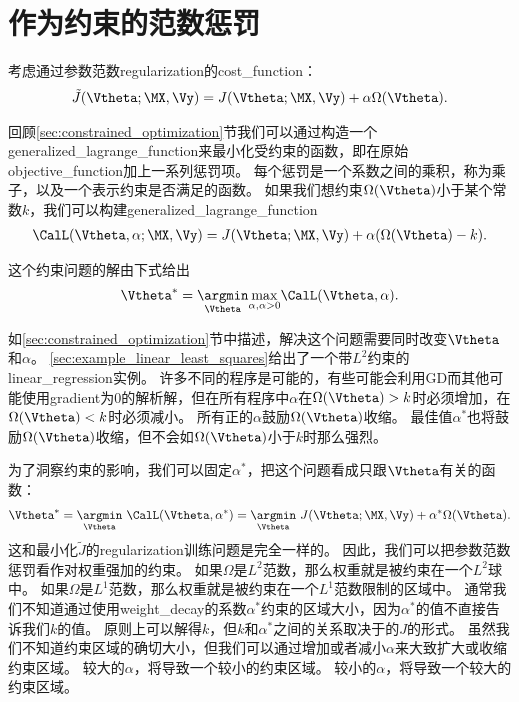  
 \section{作为约束的范数惩罚}
 \label{sec:7.2}
考虑通过参数范数\gls{regularization}的\gls{cost_function}：
\begin{align}
 \tilde{J}(\Vtheta;\MX, \Vy) = J(\Vtheta;\MX, \Vy) + \alpha \Omega(\Vtheta) .
\end{align}

回顾\ref{sec:constrained_optimization}节我们可以通过构造一个\gls{generalized_lagrange_function}来最小化受约束的函数，即在原始\gls{objective_function}加上一系列惩罚项。
每个惩罚是一个系数之间的乘积，称为乘子，以及一个表示约束是否满足的函数。
如果我们想约束$\Omega(\Vtheta)$小于某个常数$k$，我们可以构建\gls{generalized_lagrange_function}
\begin{align}
 \CalL(\Vtheta, \alpha; \MX, \Vy) = J(\Vtheta; \MX, \Vy) + \alpha (\Omega(\Vtheta) - k).
\end{align}

这个约束问题的解由下式给出
\begin{align}
 \Vtheta^* = \underset{\Vtheta}{ \argmin} \underset{\alpha, \alpha>0}{\max} \CalL(\Vtheta, \alpha).
\end{align}

如\ref{sec:constrained_optimization}节中描述，解决这个问题需要同时改变$\Vtheta$和$\alpha$。
\ref{sec:example_linear_least_squares}给出了一个带$L^2$约束的\gls{linear_regression}实例。
许多不同的程序是可能的，有些可能会利用\gls{GD}而其他可能使用\gls{gradient}为0的解析解，但在所有程序中$\alpha$在$\Omega(\Vtheta) > k$时必须增加，在$\Omega(\Vtheta) < k$时必须减小。
所有正的$\alpha$鼓励$\Omega(\Vtheta)$收缩。
最佳值$\alpha^*$也将鼓励$\Omega(\Vtheta)$收缩，但不会如$\Omega(\Vtheta)$小于$k$时那么强烈。

为了洞察约束的影响，我们可以固定$\alpha^*$，把这个问题看成只跟$\Vtheta$有关的函数：
\begin{align}
 \Vtheta^* =  \underset{\Vtheta}{ \argmin} ~\CalL(\Vtheta, \alpha^*) = 
 \underset{\Vtheta}{ \argmin}~
 J(\Vtheta; \MX, \Vy) + \alpha^* \Omega(\Vtheta).
\end{align}
这和最小化$\tilde J$的\gls{regularization}训练问题是完全一样的。
因此，我们可以把参数范数惩罚看作对权重强加的约束。
如果$\Omega$是$L^2$范数，那么权重就是被约束在一个$L^2$球中。
如果$\Omega$是$L^1$范数，那么权重就是被约束在一个$L^1$范数限制的区域中。
通常我们不知道通过使用\gls{weight_decay}的系数$\alpha^*$约束的区域大小，因为$\alpha^*$的值不直接告诉我们$k$的值。
原则上可以解得$k$，但$k$和$\alpha^*$之间的关系取决于的$J$的形式。
虽然我们不知道约束区域的确切大小，但我们可以通过增加或者减小$\alpha$来大致扩大或收缩约束区域。
较大的$\alpha$，将导致一个较小的约束区域。
较小的$\alpha$，将导致一个较大的约束区域。

